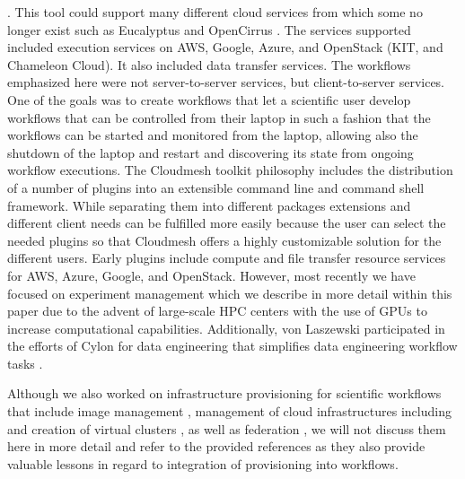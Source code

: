 \documentclass[utf8]{FrontiersinVancouver} %
\begin{document}
\citep{las-04-ftp-journal}
\citep{las-03-ftp}.
This tool could support many different cloud services from which some no longer exist such as Eucalyptus \cite{eucalyptus} and OpenCirrus \cite{opencirrus}. The services supported included execution services on AWS, Google, Azure, and OpenStack (KIT, and Chameleon Cloud). It also included data transfer services. The workflows emphasized here were not server-to-server services, but client-to-server services. One of the goals was to create workflows that let a scientific user develop workflows that can be controlled from their laptop in such a fashion that the workflows can be started and monitored from the laptop, allowing also the shutdown of the laptop and restart and discovering its state from ongoing workflow executions. 
The Cloudmesh toolkit \citep{las-17-cloudmesh} philosophy includes the distribution of a number of plugins into an extensible command line and command shell framework. While separating them into different packages extensions and different client needs can be fulfilled more easily because the user can select the needed plugins so that Cloudmesh offers a highly customizable solution for the different users. Early plugins include compute and file transfer resource services for AWS, Azure, Google, and OpenStack. However, most recently we have focused on experiment management which we describe in more detail within this paper due to the advent of large-scale HPC centers with the use of GPUs to increase computational capabilities. 
Additionally, von Laszewski participated in the efforts of Cylon for data engineering that simplifies data engineering workflow tasks \citep{cylon,cylon-radical}. 

Although we also worked on infrastructure provisioning for scientific
workflows that include image management
\citep{las-12-imagemanagement}, management of cloud infrastructures
including \citep{las-20-10gce,las-14-bigdata,las-12-fg-bookchapter}
\citep{las-17-futuregrid} and creation of virtual clusters
\citep{las-16-virtcluster,las-19-harc-comet}, as well as federation
\citep{las-08-federated-cloud}, we will not discuss them here in more
detail and refer to the provided references as they also provide
valuable lessons in regard to integration of provisioning into
workflows.


\end{document}
